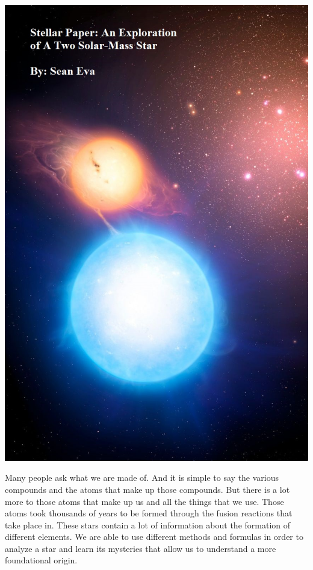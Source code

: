 \documentclass{article}
\begin{document}
\begin{titlepage}
    \centering
    \includegraphics[width=18.485cm]{Cover.jpg}
    \restoregeometry
\end{titlepage}


Many people ask what we are made of. And it is simple to say the various compounds and the atoms that make up those compounds. But there is a lot more to those atoms that make up us and all the things that we use. Those atoms took thousands of years to be formed through the fusion reactions that take place in. These stars contain a lot of information about the formation of different elements. We are able to use different methods and formulas in order to analyze a star and learn its mysteries that allow us to understand a more foundational origin.\\
\end{document}
